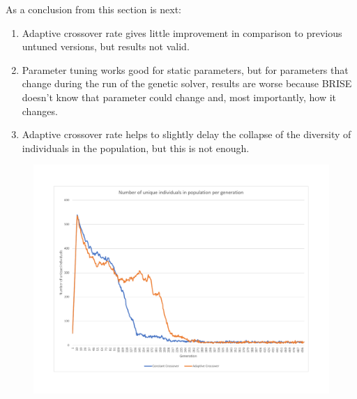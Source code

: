 As a conclusion from this section is next:
\begin{enumerate}
	\item Adaptive crossover rate gives little improvement in comparison to previous untuned versions, but results not valid.
	\item Parameter tuning works good for static parameters, but for parameters that change during the run of the genetic solver, results are worse because BRISE doesn't know that parameter could change and, most importantly, how it changes.
	\item Adaptive crossover rate helps to slightly delay the collapse of the diversity of individuals in the population, but this is not enough.
\end{enumerate} 
\begin{figure}
	\centering
	\includegraphics[width=\textwidth]{images/UniqIndividualsPerGeneration2.pdf}
	\caption[]{}
	\label{fig:UniqIndividualsPerGeneration2}
\end{figure}                        

